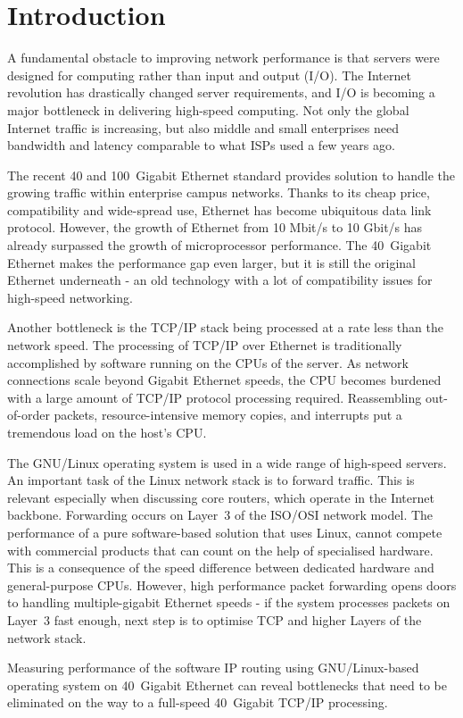 
\chapter{Introduction}
A fundamental obstacle to improving network performance is that servers were designed
for computing rather than input and output (I/O).
The Internet revolution has drastically changed server requirements,
and I/O is becoming a major bottleneck in delivering high-speed computing.
Not only the global Internet traffic is increasing, but also middle and small enterprises
need bandwidth and latency comparable to what ISPs used a few years ago.

The recent 40 and 100~Gigabit Ethernet standard provides solution
to handle the growing traffic within enterprise campus networks.
Thanks to its cheap price, compatibility and wide-spread use,
Ethernet has become ubiquitous data link protocol.
However, the growth of Ethernet from 10 Mbit/s to 10 Gbit/s has already surpassed
the growth of microprocessor performance. %
The 40~Gigabit Ethernet makes the performance gap even larger, but
it is still the original Ethernet underneath - an old technology
with a lot of compatibility issues for high-speed networking.

Another bottleneck is the TCP/IP stack being processed at a rate less than the network speed.
The processing of TCP/IP over Ethernet is traditionally accomplished by software running on the CPUs of the server.
As network connections scale beyond Gigabit Ethernet speeds,
the CPU becomes burdened with a large amount of TCP/IP protocol processing required.
Reassembling out-of-order packets, resource-intensive memory copies, and interrupts put a tremendous load on the host's CPU.

The GNU/Linux operating system is used in a wide range of high-speed servers.
An important task of the Linux network stack is to forward traffic.
This is relevant especially when discussing core routers, which operate in the Internet backbone.
Forwarding occurs on Layer~3 of the ISO/OSI network model.
The performance of a pure software-based solution that uses Linux, cannot compete
with commercial products that can count on the help of specialised hardware.
This is a consequence of the speed difference between dedicated hardware and general-purpose CPUs.
However, high performance packet forwarding opens doors to handling multiple-gigabit Ethernet speeds -
if the system processes packets on Layer~3 fast enough,
next step is to optimise TCP and higher Layers of the network stack.

Measuring performance of the software IP routing using GNU/Linux-based operating system on 40~Gigabit Ethernet
can reveal bottlenecks that need to be eliminated
on the way to a full-speed 40~Gigabit TCP/IP processing.
